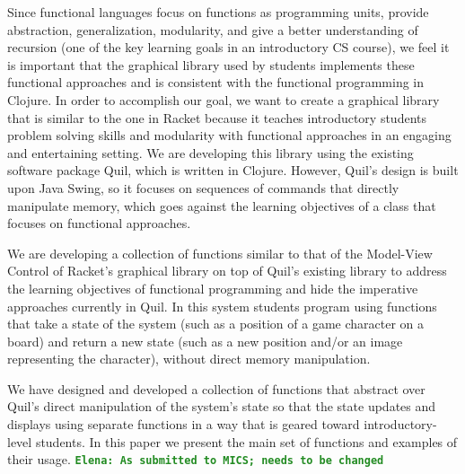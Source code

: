 \documentclass[12pt]{article}
\newcommand{\comment}[1]{{\bf \tt  {#1}}}
\newcommand{\emcomment}[1]{\textcolor{ForestGreen}{\comment{Elena: {#1}}}}
\begin{document}
Since functional languages focus on functions as programming units, provide abstraction, generalization, modularity, and give a better understanding of recursion (one of the key learning goals in an introductory CS course), we feel it is important that the graphical library used by students implements these functional approaches and is consistent with the functional programming in Clojure. In order to accomplish our goal, we want to create a graphical library that is similar to the one in Racket because it teaches introductory students problem solving skills and modularity with functional approaches in an engaging and entertaining setting. We are developing this library using the existing software package Quil, which is written in Clojure. However, Quil’s design is built upon Java Swing, so it focuses on sequences of commands that directly manipulate memory, which goes against the learning objectives of a class that focuses on functional approaches.

We are developing a collection of functions similar to that of the Model-View Control of Racket’s graphical library on top of Quil’s existing library to address the learning objectives of functional programming and hide the imperative approaches currently in Quil. In this system students program using functions that take a state of the system (such as a position of a game character on a board) and return a new state (such as a new position and/or an image representing the character), without direct memory manipulation.

We have designed and developed a collection of functions that abstract over Quil’s direct manipulation of the system’s state so that the state updates and displays using separate functions in a way that is geared toward introductory-level students. In this paper we present the main set of functions and examples of their usage. 
\emcomment{As submitted to MICS; needs to be changed}


\newpage
\setcounter{page}{1}
\end{document}
